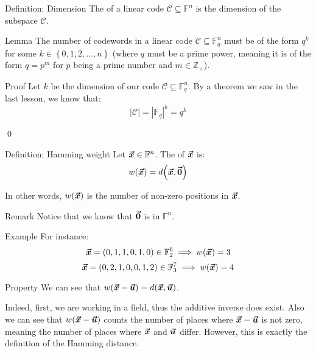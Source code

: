 \documentclass[a4paper]{article}
\begin{document}
\begin{parag}{Definition: Dimension}
    The  of a linear code $\mathcal{C} \subseteq \mathbb{F}^n$ is the dimension of the subspace $\mathcal{C}.$
\end{parag}

\begin{parag}{Lemma}
    The number of codewords in a linear code $\mathcal{C} \subseteq \mathbb{F}_q^n$ must be of the form $q^k$ for some $k \in \left\{0, 1, 2, \ldots, n\right\}$ (where $q$ must be a prime power, meaning it is of the form $q = p^m$ for $p$ being a prime number and $m \in \mathbb{Z}_+$).

    \begin{subparag}{Proof}
        Let $k$ be the dimension of our code $\mathcal{C} \subseteq \mathbb{F}_q^n$. By a theorem we saw in the last lesson, we know that: 
        \[\left|\mathcal{C}\right| = \left|\mathbb{F}_q\right|^k = q^k\]
        
        \qed
    \end{subparag}
\end{parag}

\begin{parag}{Definition: Hamming weight}
    Let $\bm{\protect\vec{x}} \in \mathbb{F}^n$. The  of $\bm{\protect\vec{x}}$ is:
    \[w\left(\bvec{x}\right) = d\left(\bvec{x}, \bvec{0}\right)\]

    In other words, $w\left(\bvec{x}\right)$ is the number of non-zero positions in $\bm{\protect\vec{x}}$.

    \begin{subparag}{Remark}
        Notice that we know that $\bm{\protect\vec{0}}$ is in $\mathbb{F}^n$.
    \end{subparag}

    \begin{subparag}{Example}
        For instance:
        \[\bvec{x} = \left(0, 1, 1, 0, 1, 0\right) \in \mathbb{F}_2^6 \implies w\left(\bvec{x}\right) = 3\]
        \[\bvec{x} = \left(0, 2, 1, 0, 0, 1, 2\right) \in \mathbb{F}_3^7 \implies w\left(\bvec{x}\right) = 4\]

    \end{subparag}

    \begin{subparag}{Property}
        We can see that $w\left(\bvec{x} - \bvec{u}\right)= d\left(\bvec{x}, \bvec{u}\right)$.

        Indeed, first, we are working in a field, thus the additive inverse does exist. Also we can see that $w\left(\bvec{x} - \bvec{u}\right)$ counts the number of places where $\bm{\protect\vec{x}} - \bm{\protect\vec{u}}$ is not zero, meaning the number of places where $\bm{\protect\vec{x}}$ and $\bm{\protect\vec{u}}$ differ. However, this is exactly the definition of the Hamming distance. 
    \end{subparag}
\end{parag}
\end{document}
